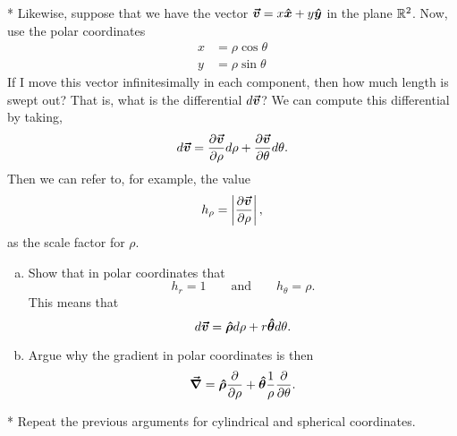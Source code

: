 \documentclass[12pt]{article} %
\begin{document}
\vspace*{1cm}
\begin{problem} *
    Likewise, suppose that we have the vector $\boldsymbol{\boldsymbol{\vec{v}}} = x\boldsymbol{\hat{x}} + y\boldsymbol{\hat{y}}$ in the plane $\mathbb{R}^2$.  Now, use the polar coordinates
    \begin{align*}
    x &= \rho \cos \theta\\
    y &= \rho \sin \theta
    \end{align*}
    If I move this vector infinitesimally in each component, then how much length is swept out? That is, what is the differential $d\boldsymbol{\boldsymbol{\vec{v}}}$? We can compute this differential by taking,
    \[
    d\boldsymbol{\boldsymbol{\vec{v}}} = \frac{\partial \boldsymbol{\boldsymbol{\vec{v}}}}{\partial \rho}d\rho+\frac{\partial \boldsymbol{\boldsymbol{\vec{v}}}}{\partial \theta}d\theta.
    \]
    Then we can refer to, for example, the value
        \[
        h_\rho = \left| \frac{\partial \boldsymbol{\boldsymbol{\vec{v}}}}{\partial \rho} \right|,
        \]
        as the scale factor for $\rho$.
    \begin{enumerate}[(a)]
        \item Show that in polar coordinates that
        \[
        h_r = 1 \qquad \textrm{and} \qquad h_\theta = \rho.
        \]
        This means that
        \[
        d\boldsymbol{\boldsymbol{\vec{v}}} =  \boldsymbol{\boldsymbol{\hat{\rho}}} d\rho + r\boldsymbol{\boldsymbol{\hat{\theta}}} d\theta.
        \]
        \item Argue why the gradient in polar coordinates is then
        \[
        \boldsymbol{\vec{\nabla}} = \boldsymbol{\boldsymbol{\hat{\rho}}} \frac{\partial}{\partial \rho} + \boldsymbol{\boldsymbol{\hat{\theta}}} \frac{1}{\rho}\frac{\partial}{\partial \theta}.
        \]
    \end{enumerate}
\end{problem}

\vspace*{1cm}
\begin{problem}
    * Repeat the previous arguments for cylindrical and spherical coordinates.
\end{problem}


\end{document}

